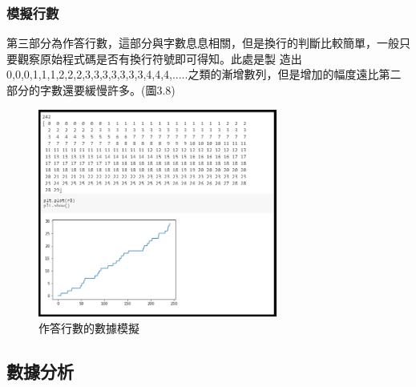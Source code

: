 \subsubsection{模擬行數}
第三部分為作答行數，這部分與字數息息相關，但是換行的判斷比較簡單，一般只要觀察原始程式碼是否有換行符號即可得知。此處是製
造出0,0,0,1,1,1,2,2,2,3,3,3,3,3,3,3,4,4,4,.....之類的漸增數列，但是增加的幅度遠比第二部分的字數還要緩慢許多。(圖3.8)
	\begin{figure}[H] %
	\centering %
	\includegraphics[width=0.7\textwidth]{3_2_1_5.png} %
	\caption{作答行數的數據模擬} %
	\label{Fig.3.8} %
	\end{figure}

\subsection{數據分析}
